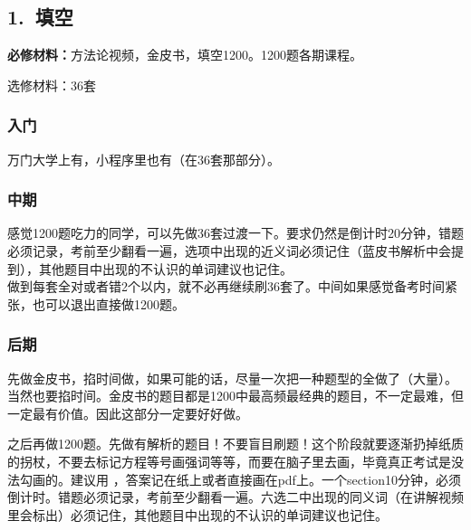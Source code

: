 \documentclass[11pt,a4paper]{article}
\begin{document}
{{{		}
	\newpage
		\subsection*{1.~填空}{
			
			\vspace{33pt}
			{\bfseries 必修材料：}方法论视频，金皮书，填空1200。1200题各期课程。
			
			选修材料：36套
			
			
			\subsubsection*{入门}
			万门大学上有，小程序里也有（在36套那部分）。
			
			\subsubsection*{中期}感觉1200题吃力的同学，可以先做36套过渡一下。要求仍然是倒计时20分钟，错题必须记录，考前至少翻看一遍，选项中出现的近义词必须记住（蓝皮书解析中会提到），其他题目中出现的不认识的单词建议也记住。
			\\
			做到每套全对或者错2个以内，就不必再继续刷36套了。中间如果感觉备考时间紧张，也可以退出直接做1200题。
			
			\subsubsection*{后期}先做金皮书，掐时间做，如果可能的话，尽量一次把一种题型的全做了（大量）。当然也要掐时间。金皮书的题目都是1200中最高频最经典的题目，不一定最难，但一定最有价值。因此这部分一定要好好做。
			\par 之后再做1200题。先做有解析的题目！不要盲目刷题！这个阶段就要逐渐扔掉纸质的拐杖，不要去标记方程等号画强词等等，而要在脑子里去画，毕竟真正考试是没法勾画的。建议用
			，答案记在纸上或者直接画在pdf上。一个section10分钟，必须倒计时。错题必须记录，考前至少翻看一遍。六选二中出现的同义词（在讲解视频里会标出）必须记住，其他题目中出现的不认识的单词建议也记住。
			
}}}
\end{document}
